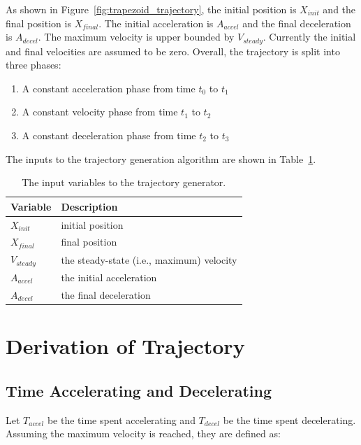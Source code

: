 \documentclass[11pt]{article} %
\begin{document}
 \noindent As shown in Figure~\ref{fig:trapezoid_trajectory}, the initial position is $X_{init}$ and the final position is $X_{final}$. The initial acceleration is $A_{accel}$ and the final deceleration is $A_{decel}$. The maximum velocity is upper bounded by $V_{steady}$. Currently the initial and final velocities are assumed to be zero. Overall, the trajectory is split into three phases:

\begin{enumerate}
\item A constant acceleration phase from time $t_0$ to $t_1$
\item A constant velocity phase from time $t_1$ to $t_2$
\item A constant deceleration phase from time $t_2$ to $t_3$
\end{enumerate}

\noindent The inputs to the trajectory generation algorithm are shown in Table~\ref{table:inputs}.

\begin{table}[tbh]
  \centering
  \begin{tabular}{|l|l|}
   \hline
    \textbf{Variable}                  & \textbf{Description} \\
    \hline
    $X_{init}$         & initial position \\
    $X_{final}$      & final position \\
    $V_{steady}$  & the steady-state (i.e., maximum) velocity \\
    $A_{accel}$     & the initial acceleration \\
    $A_{decel}$  & the final deceleration \\
  \hline
  \end{tabular}
  \vspace{1mm}
  \caption{The input variables to the trajectory generator.}
  \label{table:inputs}
\end{table}

\section{Derivation of Trajectory}

\subsection{Time Accelerating and Decelerating}

Let $T_{accel}$ be the time spent accelerating and $T_{decel}$ be the time spent decelerating. Assuming the maximum velocity is reached, they are defined as:
\end{document}
